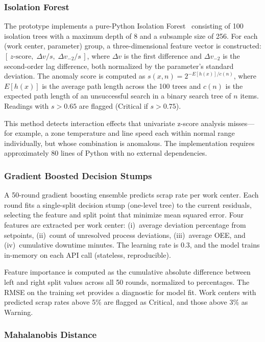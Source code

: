 \subsubsection{Isolation Forest}

The prototype implements a pure-Python Isolation Forest~\cite{liu2017}
consisting of 100 isolation trees with a maximum depth of 8 and a subsample
size of 256.  For each (work center, parameter) group, a three-dimensional
feature vector is constructed: $[\,z\text{-score},\;\Delta v / s,\;\Delta v_{-2}
/ s\,]$, where $\Delta v$ is the first difference and $\Delta v_{-2}$ is the
second-order lag difference, both normalized by the parameter's standard
deviation.  The anomaly score is computed as $s(x, n) = 2^{-E[h(x)]/c(n)}$,
where $E[h(x)]$ is the average path length across the 100 trees and $c(n)$ is
the expected path length of an unsuccessful search in a binary search tree of
$n$ items.  Readings with $s > 0.65$ are flagged (Critical if $s > 0.75$).

This method detects interaction effects that univariate z-score analysis
misses---for example, a zone temperature and line speed each within normal range
individually, but whose combination is anomalous.  The implementation requires
approximately 80 lines of Python with no external dependencies.

\subsubsection{Gradient Boosted Decision Stumps}

A 50-round gradient boosting ensemble predicts scrap rate per work center.  Each
round fits a single-split decision stump (one-level tree) to the current
residuals, selecting the feature and split point that minimize mean squared
error.  Four features are extracted per work center: (i)~average deviation
percentage from setpoints, (ii)~count of unresolved process deviations,
(iii)~average OEE, and (iv)~cumulative downtime minutes.  The learning rate is
0.3, and the model trains in-memory on each API call (stateless, reproducible).

Feature importance is computed as the cumulative absolute difference between
left and right split values across all 50 rounds, normalized to percentages.
The RMSE on the training set provides a diagnostic for model fit.  Work centers
with predicted scrap rates above 5\% are flagged as Critical, and those above
3\% as Warning.

\subsubsection{Mahalanobis Distance}

